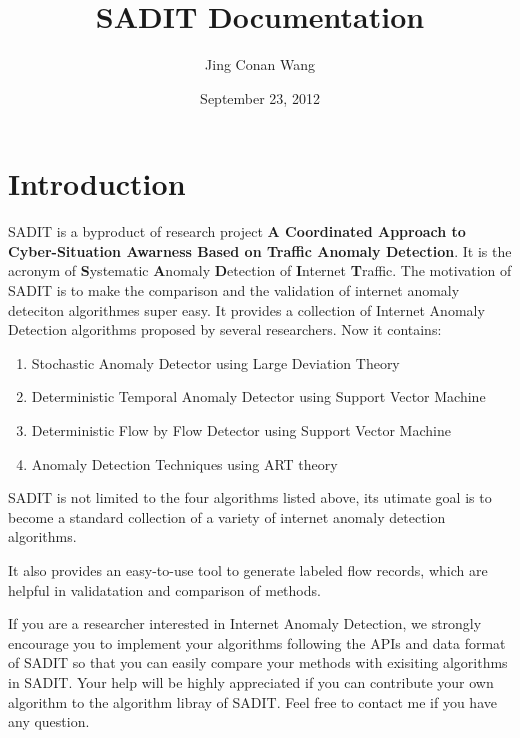 \documentclass[letterpaper,10pt,english]{sphinxmanual}
\title{SADIT Documentation}
\date{September 23, 2012}
\author{Jing Conan Wang}
\begin{document}
\maketitle
\tableofcontents
{}\label{index::doc}



\chapter{Introduction}
\label{index:introduction}\label{index:welcome-to-sadit-s-documentation}
SADIT is a byproduct of research project \textbf{A Coordinated Approach to
Cyber-Situation Awarness Based on Traffic Anomaly Detection}.  It is the
acronym of \textbf{S}ystematic \textbf{A}nomaly \textbf{D}etection of \textbf{I}nternet
\textbf{T}raffic.  The motivation of SADIT is to make the comparison and the
validation of internet anomaly deteciton algorithmes super easy.  It provides
a collection of Internet Anomaly Detection algorithms proposed by several
researchers. Now it contains:
\begin{enumerate}
\item {} 
Stochastic Anomaly Detector using Large Deviation Theory

\item {} 
Deterministic Temporal Anomaly Detector using Support Vector Machine

\item {} 
Deterministic Flow by Flow Detector using Support Vector Machine

\item {} 
Anomaly Detection Techniques using ART theory

\end{enumerate}

SADIT is not limited to the four algorithms listed above, its utimate goal is to
become a standard collection of a variety of internet anomaly detection
algorithms.

It also provides an easy-to-use tool to generate labeled flow records, which are
helpful in validatation and comparison of methods.

If you are a researcher interested in Internet Anomaly Detection, we strongly
encourage you to implement your algorithms following the APIs and data format of
SADIT so that you can easily compare your methods with exisiting algorithms in
SADIT. Your help will be highly appreciated if you can contribute your own
algorithm to the algorithm libray of SADIT. Feel free to contact me if you have
any question.
\end{document}
